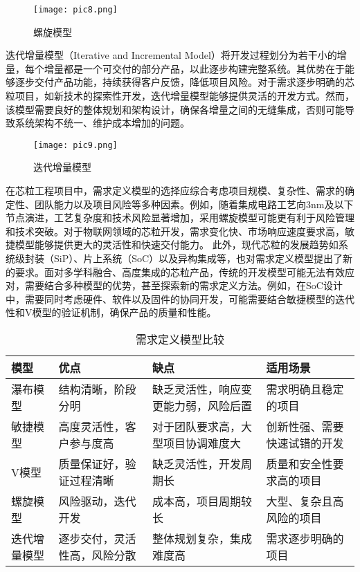 \documentclass[bachelor]{thesis-uestc}
\begin{document}
\begin{figure}[h]
    \texttt{[image: pic8.png]}
    \caption{螺旋模型}
    \label{pic8}
    \end{figure}

迭代增量模型（Iterative and Incremental Model）将开发过程划分为若干小的增量，每个增量都是一个可交付的部分产品，以此逐步构建完整系统。其优势在于能够逐步交付产品功能，持续获得客户反馈，降低项目风险。对于需求逐步明确的芯粒项目，如新技术的探索性开发，迭代增量模型能够提供灵活的开发方式。然而，该模型需要良好的整体规划和架构设计，确保各增量之间的无缝集成，否则可能导致系统架构不统一、维护成本增加的问题。

\begin{figure}[h]
    \texttt{[image: pic9.png]}
    \caption{迭代增量模型}
    \label{pic9}
    \end{figure}

在芯粒工程项目中，需求定义模型的选择应综合考虑项目规模、复杂性、需求的确定性、团队能力以及项目风险等多种因素。例如，随着集成电路工艺向3nm及以下节点演进，工艺复杂度和技术风险显著增加，采用螺旋模型可能更有利于风险管理和技术突破。对于物联网领域的芯粒开发，需求变化快、市场响应速度要求高，敏捷模型能够提供更大的灵活性和快速交付能力。
此外，现代芯粒的发展趋势如系统级封装（SiP）、片上系统（SoC）以及异构集成等，也对需求定义模型提出了新的要求。面对多学科融合、高度集成的芯粒产品，传统的开发模型可能无法有效应对，需要结合多种模型的优势，甚至探索新的需求定义方法。例如，在SoC设计中，需要同时考虑硬件、软件以及固件的协同开发，可能需要结合敏捷模型的迭代性和V模型的验证机制，确保产品的质量和性能。

\begin{table}[h]
\caption{需求定义模型比较}
\centering
\begin{tabular}{p{2.5cm}p{3.5cm}p{4cm}p{3.5cm}}
\toprule
\textbf{模型} & \textbf{优点} & \textbf{缺点} & \textbf{适用场景} \\
\midrule
瀑布模型 & 结构清晰，阶段分明 & 缺乏灵活性，响应变更能力弱，风险后置 & 需求明确且稳定的项目 \\
敏捷模型 & 高度灵活性，客户参与度高 & 对于团队要求高，大型项目协调难度大 & 创新性强、需要快速试错的开发 \\
V模型 & 质量保证好，验证过程清晰 & 缺乏灵活性，开发周期长 & 质量和安全性要求高的项目 \\
螺旋模型 & 风险驱动，迭代开发 & 成本高，项目周期较长 & 大型、复杂且高风险的项目 \\
迭代增量模型 & 逐步交付，灵活性高，风险分散 & 整体规划复杂，集成难度高 & 需求逐步明确的项目 \\
\bottomrule
\end{tabular}
\label{tab:requirement_models}
\end{table}
\end{document}
